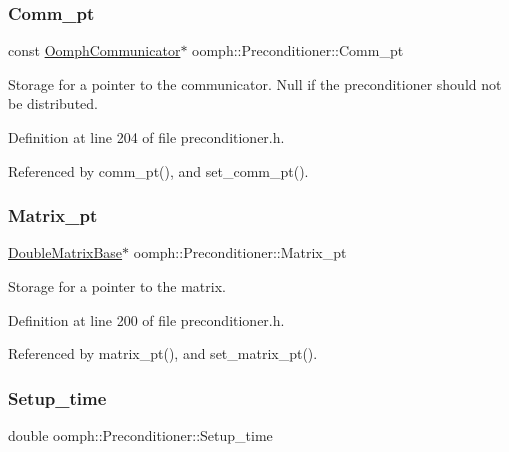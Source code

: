 \subsubsection{\texorpdfstring{Comm\+\_\+pt}{Comm\_pt}}
{\footnotesize\ttfamily const \hyperlink{classoomph_1_1OomphCommunicator}{Oomph\+Communicator}$\ast$ oomph\+::\+Preconditioner\+::\+Comm\+\_\+pt\hspace{0.3cm}{\ttfamily [private]}}



Storage for a pointer to the communicator. Null if the preconditioner should not be distributed. 



Definition at line 204 of file preconditioner.\+h.



Referenced by comm\+\_\+pt(), and set\+\_\+comm\+\_\+pt().

\mbox{\label{classoomph_1_1Preconditioner_a04caf49de41802ef112e4b8b644b1d4d}} 
\subsubsection{\texorpdfstring{Matrix\+\_\+pt}{Matrix\_pt}}
{\footnotesize\ttfamily \hyperlink{classoomph_1_1DoubleMatrixBase}{Double\+Matrix\+Base}$\ast$ oomph\+::\+Preconditioner\+::\+Matrix\+\_\+pt\hspace{0.3cm}{\ttfamily [private]}}



Storage for a pointer to the matrix. 



Definition at line 200 of file preconditioner.\+h.



Referenced by matrix\+\_\+pt(), and set\+\_\+matrix\+\_\+pt().

\mbox{\label{classoomph_1_1Preconditioner_a00f5ae98e81e7cb9aa6a70a39a9759c8}} 
\subsubsection{\texorpdfstring{Setup\+\_\+time}{Setup\_time}}
{\footnotesize\ttfamily double oomph\+::\+Preconditioner\+::\+Setup\+\_\+time\hspace{0.3cm}{\ttfamily [private]}}



